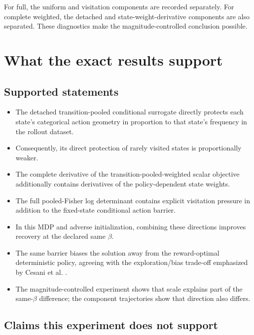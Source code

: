 \documentclass[10pt,a4paper]{article}
\begin{document}
For full, the uniform and visitation components are recorded separately.  For
complete weighted, the detached and state-weight-derivative components are
also separated.  These diagnostics make the magnitude-controlled conclusion
possible.

\section{What the exact results support}

\subsection{Supported statements}

\begin{itemize}
\item The detached transition-pooled conditional surrogate directly protects
each state's categorical action geometry in proportion to that state's
frequency in the rollout dataset.
\item Consequently, its direct protection of rarely visited states is
proportionally weaker.
\item The complete derivative of the transition-pooled-weighted scalar
objective additionally contains derivatives of the policy-dependent state
weights.
\item The full pooled-Fisher log determinant contains explicit visitation
pressure in addition to the fixed-state conditional action barrier.
\item In this MDP and adverse initialization, combining these directions
improves recovery at the declared same $\beta$.
\item The same barrier biases the solution away from the reward-optimal
deterministic policy, agreeing with the exploration/bias trade-off emphasized
by Cesani et al. \cite[Sec.~6.1 and App.~E.2]{cesani2026}.
\item The magnitude-controlled experiment shows that scale explains part of
the same-$\beta$ difference; the component trajectories show that direction
also differs.
\end{itemize}

\subsection{Claims this experiment does not support}
\end{document}
